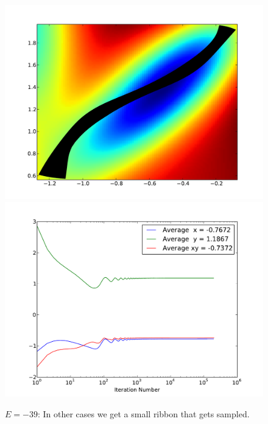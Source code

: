 \documentclass[letterpaper]{article}
\begin{document}
\begin{figure}[p]
\begin{center}
\includegraphics[width=5in]{t4.pdf}
\includegraphics[width=5in]{t4a.pdf}
\end{center}
\caption{$E=-39$: In other cases we get a small ribbon that gets sampled.}
\label{fig:t4}
\end{figure}
\end{document}
